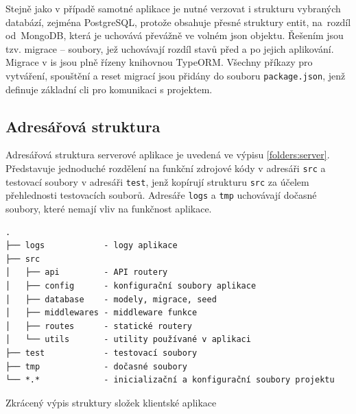 Stejně jako v případě samotné aplikace je nutné verzovat i strukturu vybraných databází, zejména PostgreSQL, protože obsahuje přesné struktury entit, na~rozdíl od~\mbox{MongoDB}, která je uchovává převážně ve volném \gls{json} objektu. Řešením jsou tzv. migrace -- soubory, jež uchovávají rozdíl stavů před a po jejich aplikování. Migrace v \gls{is} jsou plně řízeny knihovnou TypeORM. Všechny příkazy pro vytváření, spouštění a reset migrací jsou přidány do souboru \texttt{package.json}, jenž definuje základní \gls{cli} pro komunikaci s projektem.





\subsection{Adresářová struktura}

Adresářová struktura serverové aplikace je uvedená ve výpisu \ref{folders:server}. Představuje jednoduché rozdělení na funkční zdrojové kódy v adresáři \texttt{src} a testovací soubory v adresáři \texttt{test}, jenž kopírují strukturu \texttt{src} za účelem přehlednosti testovacích souborů. Adresáře \texttt{logs} a \texttt{tmp} uchovávají dočasné soubory, které nemají vliv na funkčnost aplikace.

\begin{fig:code}
   \begin{verbatim}
.
├── logs            - logy aplikace
├── src
│   ├── api         - API routery
│   ├── config      - konfigurační soubory aplikace
│   ├── database    - modely, migrace, seed
│   ├── middlewares - middleware funkce
│   ├── routes      - statické routery
│   └── utils       - utility používané v aplikaci
├── test            - testovací soubory
├── tmp             - dočasné soubory
└── *.*             - inicializační a konfigurační soubory projektu
   \end{verbatim}
   \caption{Zkrácený výpis struktury složek klientské aplikace}\label{folders:server}
\end{fig:code}





